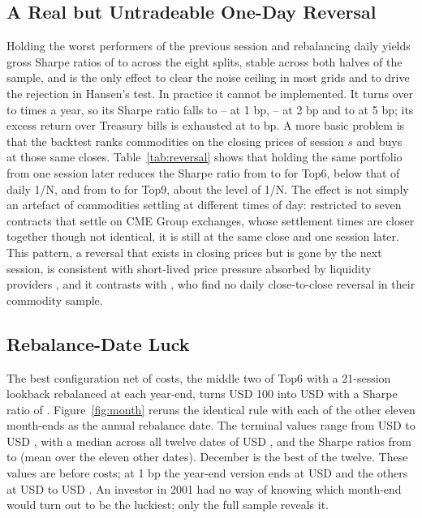 \documentclass[commodities,article,submit,pdftex,moreauthors]{Definitions/mdpi}
\begin{document}
\subsection{A Real but Untradeable One-Day Reversal}\label{sec:reversal}

Holding the worst performers of the previous session and rebalancing daily yields gross Sharpe ratios of \revSrLo{} to \revSrHi{} across the eight splits, stable across both halves of the sample, and is the only effect to clear the noise ceiling in most grids and to drive the rejection in Hansen's test. In practice it cannot be implemented. It turns over \revTurnLo{} to \revTurnHi{} times a year, so its Sharpe ratio falls to \revSrOneLo--\revSrOneHi{} at 1 bp, \revSrTwoLo--\revSrTwoHi{} at 2 bp and \revSrFiveLo{} to \revSrFiveHi{} at 5 bp; its excess return over Treasury bills is exhausted at \revBeCashLo{} to \revBeCashHi{} bp. A more basic problem is that the backtest ranks commodities on the closing prices of session $s$ and buys at those same closes. Table~\ref{tab:reversal} shows that holding the same portfolio from one session later reduces the Sharpe ratio from \revSixLagZero{} to \revSixLagOne{} for Top6, below that of daily 1/N, and from \revNineLagZero{} to \revNineLagOne{} for Top9, about the level of 1/N. The effect is not simply an artefact of commodities settling at different times of day: restricted to seven contracts that settle on CME Group exchanges, whose settlement times are closer together though not identical, it is still \revUsLagZero{} at the same close and \revUsLagOne{} one session later. This pattern, a reversal that exists in closing prices but is gone by the next session, is consistent with short-lived price pressure absorbed by liquidity providers \citep{kang2020}, and it contrasts with \citet{dellacorte2015}, who find no daily close-to-close reversal in their commodity sample.



\subsection{Rebalance-Date Luck}

The best configuration net of costs, the middle two of Top6 with a 21-session lookback rebalanced at each year-end, turns USD 100 into USD \starDec{} with a Sharpe ratio of \starSrDec. Figure~\ref{fig:month} reruns the identical rule with each of the other eleven month-ends as the annual rebalance date. The terminal values range from USD \starMin{} to USD \starMaxOther{}, with a median across all twelve dates of USD \starMedian{}, and the Sharpe ratios from \starSrMin{} to \starSrMaxOther{} (mean \starSrOtherMean{} over the eleven other dates). December is the best of the twelve. These values are before costs; at 1 bp the year-end version ends at USD \starDecOne{} and the others at USD \starMinOne{} to USD \starMaxOne. An investor in 2001 had no way of knowing which month-end would turn out to be the luckiest; only the full sample reveals it.
\end{document}
